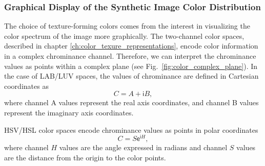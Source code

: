 
\subsubsection{Graphical Display of the Synthetic Image Color Distribution}
The choice of texture-forming colors comes from the interest in visualizing the color spectrum of the image more graphically. The two-channel color spaces, described in chapter \ref{ch:color_texure_representations}, encode color information in a complex chrominance channel. Therefore, we can interpret the chrominance values as points within a complex plane (see Fig.\ \ref{fig:color_complex_plane}). In the case of LAB/LUV spaces, the values of chrominance are defined in Cartesian coordinates as 
\begin{equation}\label{eq:chrominance_lab2}
    C = A + \mathsf{i}B,
\end{equation}
where channel A values represent the real axis coordinates, and channel B values represent the imaginary axis coordinates. 

HSV/HSL color spaces encode chrominance values as points in polar coordinates 
\begin{equation}\label{eq:chrominance_hsv2}
    C = S \mathsf{e}^{\mathsf{i}H},
\end{equation}
where channel $H$ values are the angle expressed in radians and channel $S$ values are the distance from the origin to the color points.

